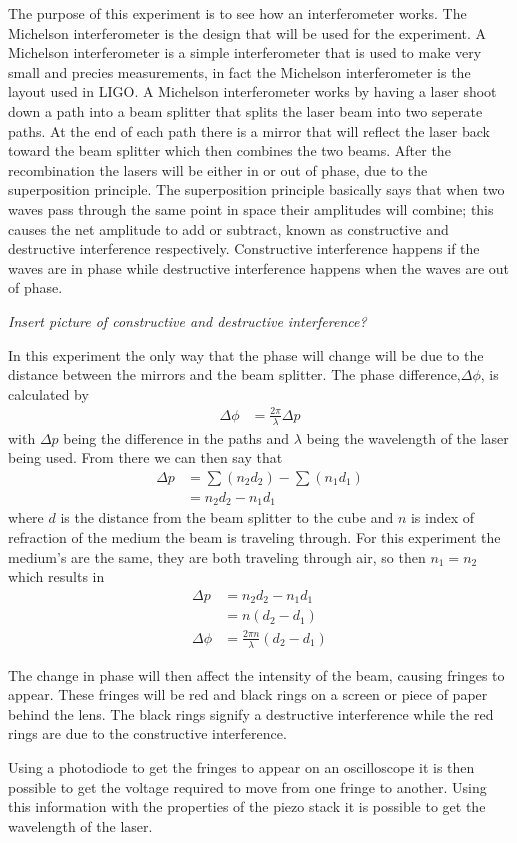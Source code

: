 	The purpose of this experiment is to see how an interferometer works. The Michelson interferometer is the design that 
will be used for the experiment. A Michelson interferometer is a simple interferometer that is used to make very small and precies
measurements, in fact the Michelson interferometer is the layout used in LIGO. A Michelson interferometer works by having a laser 
shoot down a path into a beam splitter that splits the laser beam into two seperate paths. At the end of each path there is a mirror
that will reflect the laser back toward the beam splitter which then combines the two beams. After the recombination the lasers 
will be either in or out of phase, due to the superposition principle. The superposition principle basically says that when two waves
pass through the same point in space their amplitudes will combine; this causes the net amplitude to add or subtract, known as
constructive and destructive interference respectively. Constructive interference happens if the waves are in phase while destructive 
interference happens when the waves are out of phase.

\emph{Insert picture of constructive and destructive interference?}

	In this experiment the only way that the phase will change will be due to the distance between the mirrors and the beam splitter.
The phase difference,$\Delta \phi$, is calculated by 
	\begin{align}
		\nonumber \Delta \phi &=\frac{2\pi}{\lambda} \Delta p
	\end{align}
with $\Delta p$ being the difference in the paths and $\lambda$ being the wavelength of the laser being used. From there we can then say that 
	\begin{align}
		\nonumber \Delta p &=\sum(n_2 d_2)-\sum(n_1 d_1) \\
		\nonumber		&=n_2 d_2 - n_1 d_1
	\end{align} 
where $d$ is the distance from the beam splitter to the cube and $n$ is index of refraction of the medium the beam is traveling 
through. For this experiment the medium's are the same, they are both traveling through air, so then $n_1=n_2$ which results in
	\begin{align}
		\nonumber \Delta p &= n_2 d_2 - n_1 d_1 \\
		\nonumber 	&= n(d_2 - d_1) \\
		\nonumber \Delta \phi &=\frac{2\pi n}{\lambda} (d_2 - d_1)
	\end{align}

	The change in phase will then affect the intensity of the beam, causing fringes to appear. These fringes will be red and black
rings on a screen or piece of paper behind the lens. The black rings signify a destructive interference while the red rings are 
due to the constructive interference. 

	Using a photodiode to get the fringes to appear on an oscilloscope it is then possible to get the voltage required to move 
from one fringe to another. Using this information with the properties of the piezo stack it is possible to get the wavelength of
the laser. 


